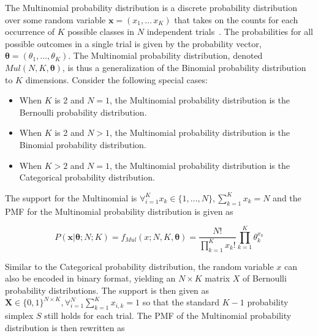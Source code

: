 The Multinomial probability distribution is a discrete probability distribution over some random variable $\boldsymbol{x} = (x_{1}, \dots\, x_{K})$ that takes on the counts for each occurrence of $K$ possible classes in $N$ independent trials~\cite{ref:wackerly:2014}. The probabilities for all possible outcomes in a single trial is given by the probability vector, $\boldsymbol{\theta} = (\theta_{1}, \dots, \theta_{K})$. The Multinomial probability distribution, denoted $Mul(N, K, \boldsymbol{\theta})$, is thus a generalization of the Binomial probability distribution to $K$ dimensions. Consider the following special cases:

\begin{itemize}
      \item When $K$ is 2 and $N = 1$, the Multinomial probability distribution is the Bernoulli probability distribution.
      \item When $K$ is 2 and $N > 1$, the Multinomial probability distribution is the Binomial probability distribution.
      \item When $K > 2$ and $N = 1$, the Multinomial probability distribution is the Categorical probability distribution.
\end{itemize}

The support for the Multinomial is $\forall_{i=1}^{K} x_{k} \in \{1, \dots, N\}, \sum_{k=1}^{K}x_{k} = N$ and the \acs{PMF} for the Multinomial probability distribution is given as

\begin{equation}
      \label{eq:probability:probability_distributions:multinomial:pmf}
      P(\boldsymbol{x} \vert \boldsymbol{\theta}; N; K) = f_{Mul}(x; N, K, \boldsymbol{\theta}) = \frac{N!}{\prod_{k=1}^{K}x_{k}!} \prod_{k=1}^{K}\theta_{k}^{x_{k}}
\end{equation}

Similar to the Categorical probability distribution, the random variable $x$ can also be encoded in binary format, yielding an $N \times K$ matrix $X$ of Bernoulli probability distributions. The support is then given as $\boldsymbol{X} \in \{0, 1\}^{N \times K}, \forall_{i=1}^{N}\sum_{k=1}^{K} x_{i,k} = 1$ so that the standard $K-1$ probability simplex $S$ still holds for each trial. The \acs{PMF} of the Multinomial probability distribution is then rewritten as

